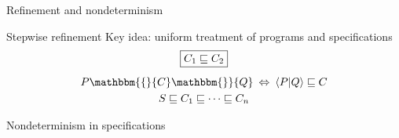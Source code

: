\documentclass[aspectratio=141]{beamer}
\newcommand{\htr}[3]{{ {#1} \mathbbm{\{} {#2} \mathbbm{\}} {#3} }}
\begin{document}
\begin{frame}{Refinement and nondeterminism} %
  \begin{block}{Stepwise refinement}
  Key idea: uniform treatment of programs and specifications
  \begin{gather*}
    \fbox{$C_1 \sqsubseteq C_2$} \\[1ex]
    \htr{P}{C}{Q} \: \Leftrightarrow \:
      \langle P | Q \rangle \sqsubseteq C \\
    S \sqsubseteq C_1 \sqsubseteq \cdots \sqsubseteq C_n
  \end{gather*}
  \end{block}
  \pause
  \begin{block}{Nondeterminism in specifications}
\end{block}
\end{frame}
\end{document}
